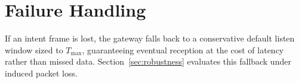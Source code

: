 \section{Failure Handling}
If an intent frame is lost, the gateway falls back to a conservative default listen window
sized to $T_{\max}$, guaranteeing eventual reception at the cost of latency rather than
missed data. Section~\ref{sec:robustness} evaluates this fallback under induced packet loss.

